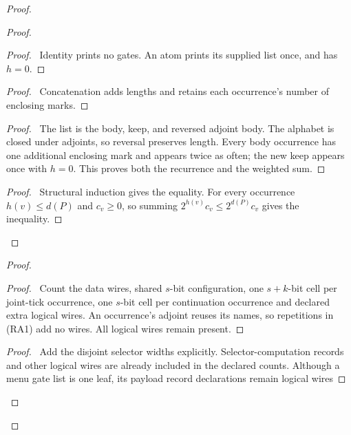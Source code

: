 \begin{proof}
 \begin{proof}
  \begin{proof}\pf\ Identity prints no gates. An atom prints its
  supplied list once, and has $h=0$.\end{proof}
  \begin{proof}\pf\ Concatenation adds lengths and retains each
  occurrence's number of enclosing marks.\end{proof}
  \begin{proof}\pf\ The list is the body, keep, and reversed adjoint
  body. The alphabet is closed under adjoints, so reversal preserves
  length. Every body occurrence has one additional enclosing mark and
  appears twice as often; the new keep appears once with $h=0$.
  This proves both the recurrence and the weighted sum.\end{proof}
  \qedstep
  \begin{proof}\pf\ Structural induction gives the equality. For
  every occurrence $h(v)\leq d(P)$ and $c_v\geq0$, so summing
  $2^{h(v)}c_v\leq2^{d(P)}c_v$ gives the inequality.\end{proof}
 \end{proof}
\begin{proof}
 \begin{proof}\pf\ Count the data wires, shared $s$-bit
 configuration, one $s+k$-bit cell per joint-tick occurrence, one
 $s$-bit cell per continuation occurrence and declared extra logical
 wires. An occurrence's adjoint reuses its names, so repetitions
 in (RA1) add no wires. All logical wires remain present.\end{proof}
 \begin{proof}\pf\ Add the disjoint selector widths explicitly.
 Selector-computation records and other logical wires are already
 included in the declared counts. Although a menu gate list is
 one leaf, its payload record declarations remain logical wires

\end{proof}
\end{proof}
\end{proof}
